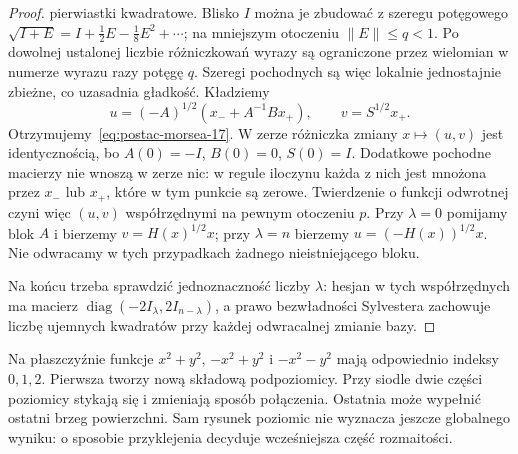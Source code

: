 \begin{proof}
pierwiastki kwadratowe. Blisko $I$
można je zbudować z szeregu potęgowego
$\sqrt{I+E}
 =I+\tfrac12E-\tfrac18E^2+\cdots$;
na mniejszym otoczeniu $\|E\|\leq q<1$.
Po dowolnej ustalonej liczbie różniczkowań
wyrazy są ograniczone przez wielomian
w numerze wyrazu razy potęgę $q$.
Szeregi pochodnych są więc lokalnie
jednostajnie zbieżne, co uzasadnia gładkość. Kładziemy
\[
 u=(-A)^{1/2}(x_-+A^{-1}Bx_+),
 \qquad v=S^{1/2}x_+.
\]
Otrzymujemy~\eqref{eq:postac-morsea-17}.
W zerze różniczka zmiany
$x\mapsto(u,v)$ jest identycznością,
bo $A(0)=-I$, $B(0)=0$, $S(0)=I$.
Dodatkowe pochodne macierzy nie wnoszą w zerze nic:
w regule iloczynu każda z nich jest mnożona przez $x_-$
lub $x_+$, które w tym punkcie są zerowe.
Twierdzenie o funkcji odwrotnej
czyni więc $(u,v)$ współrzędnymi
na pewnym otoczeniu $p$.
Przy $\lambda=0$ pomijamy blok $A$ i bierzemy
$v=H(x)^{1/2}x$; przy $\lambda=n$ bierzemy
$u=(-H(x))^{1/2}x$. Nie odwracamy w tych
przypadkach żadnego nieistniejącego bloku.

Na końcu trzeba sprawdzić jednoznaczność
liczby $\lambda$: hesjan w tych
współrzędnych ma macierz
$\operatorname{diag}(-2I_\lambda,2I_{n-\lambda})$,
a prawo bezwładności Sylvestera
zachowuje liczbę ujemnych kwadratów
przy każdej odwracalnej zmianie bazy.
\end{proof}

\begin{przyklad}
Na płaszczyźnie funkcje $x^2+y^2$,
$-x^2+y^2$ i $-x^2-y^2$ mają
odpowiednio indeksy $0,1,2$.
Pierwsza tworzy nową składową
podpoziomicy. Przy siodle dwie
części poziomicy stykają się
i zmieniają sposób połączenia.
Ostatnia może wypełnić ostatni
brzeg powierzchni. Sam rysunek
poziomic nie wyznacza jeszcze
globalnego wyniku: o sposobie
przyklejenia decyduje wcześniejsza
część rozmaitości.
\end{przyklad}


